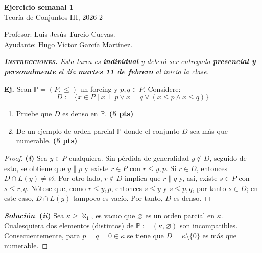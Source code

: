 \documentclass[letterpaper,DIV=15,12pt]{scrartcl}
\renewcommand{\qedsymbol}{$\blacksquare$}
\newenvironment{solucion}{\renewcommand{\qedsymbol}{$\boxtimes$}\begin{proof}[\normalfont\bfseries Solución]}{\end{proof}}
\newcounter{Ejer}
\newcommand{\pts}{}
\newenvironment{ejercicio}[1]{\noindent
        \ifthenelse{\equal{#1}{1}}{\renewcommand{\pts}{\textbf{(#1 pt)}}}{\renewcommand{\pts}{\textbf{(#1 pts)}}}\textbf{Ej. \theEjer} \pts\stepcounter{Ejer}}{}
\renewcommand{\emptyset}{\varnothing}
\newcommand{\tq}{\mid}
\begin{document}
    \thispagestyle{plain}
       \begin{center}
            {\fontsize{30}{60}\rmfamily \textbf{Ejercicio semanal 1}} \\ \vspace{.2cm} Teoría de Conjuntos III, 2026-2
       \end{center}
        \begin{flushright}
            \footnotesize \hfill Profesor: Luis Jesús Turcio Cuevas.\\
            \hfill Ayudante: Hugo Víctor García Martínez.
        \end{flushright}
   
       \textit{\textbf{\textsc{Instrucciones.}} Esta tarea es \textbf{individual} y deberá ser entregada \textbf{presencial y personalmente} el día \textbf{martes 11 de febrero} al inicio la clase.}\vspace{.3cm}

    \begin{ejercicio}{10}
        Sean $\mathbb{P}=(P,\leq)$ un forcing y $p,q \in P$. Considere:
        \[ D:=\{ x \in P \tq x \perp p \lor x \perp q \lor (x \leq p \land x \leq q) \} \]
    \end{ejercicio}
    \begin{enumerate}
        \item Pruebe que $D$ es denso en $\mathbb{P}$. \hfill \textbf{(5 pts)}
\item De un ejemplo de orden parcial $\mathbb{P}$ donde el conjunto $D$ sea más que numerable. \hfill \textbf{(5 pts)}
    \end{enumerate}
    \begin{proof}{\bfseries (\textit{i})}
        Sea $y \in P$ cualquiera. Sin pérdida de generalidad $y \notin D$, seguido de esto, se obtiene que $y \parallel p$ y existe $r \in P$ con $r \leq y,p$. Si $r \in D$, entonces $D \cap L(y) \neq \emptyset$. Por otro lado, $r \notin D$ implica que $r \parallel q$ y, así, existe $s \in P$ con $s \leq r,q$. Nótese que, como $r \leq y,p$, entonces $s \leq y$ y $s \leq p,q$, por tanto $s \in D$; en este caso, $D \cap L(y)$ tampoco es vacío. Por tanto, $D$ es denso.
    \end{proof}
    \begin{solucion}{\bfseries (\textit{ii})}
        Sea $\kappa \geq \aleph_1$, es vacuo que $\emptyset$ es un orden parcial en $\kappa$. Cualesquiera dos elementos (distintos) de $\mathbb{P}:=(\kappa,\emptyset)$ son incompatibles. Consecuentemente, para $p=q=0 \in \kappa$ se tiene que $D=\kappa \setminus \{0\}$ es más que numerable.
    \end{solucion}
    
\end{document}

